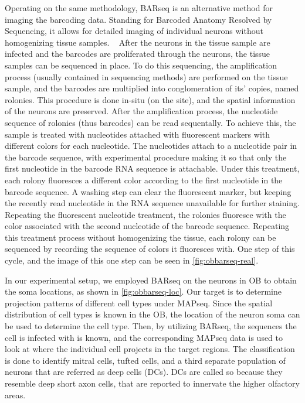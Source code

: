 \documentclass[../dissertation.tex]{subfiles}
\begin{document}
Operating on the same methodology, BARseq is an alternative method for imaging the barcoding data.
Standing for Barcoded Anatomy Resolved by Sequencing, it allows for detailed imaging of individual neurons without homogenizing tissue samples.
~\cite{mapseq060}
After the neurons in the tissue sample are infected and the barcodes are proliferated through the neurons, the tissue samples can be sequenced in place.
To do this sequencing, the amplification process (usually contained in sequencing methods) are performed on the tissue sample, and the barcodes are multiplied into conglomeration of its' copies, named rolonies.
This procedure is done in-situ (on the site), and the spatial information of the neurons are preserved.
After the amplification process, the nucleotide sequence of rolonies (thus barcodes) can be read sequentally.
To achieve this, the sample is treated with nucleotides attached with fluorescent markers with different colors for each nucleotide.
The nucleotides attach to a nucleotide pair in the barcode sequence, with experimental procedure making it so that only the first nucleotide in the barcode RNA sequence is attachable.
Under this treatment, each rolony fluoresces a different color according to the first nucleotide in the barcode sequence.
A washing step can clear the fluorescent marker, but keeping the recently read nucleotide in the RNA sequence unavailable for further staining.
Repeating the fluorescent nucleotide treatment, the rolonies fluoresce with the color associated with the second nucleotide of the barcode sequence.
Repeating this treatment process without homogenizing the tissue, each rolony can be sequenced by recording the sequence of colors it fluoresces with.
One step of this cycle, and the image of this one step can be seen in \cref{fig:obbarseq-real}.

In our experimental setup, we employed BARseq on the neurons in OB to obtain the soma locations, as shown in \cref{fig:obbarseq-loc}.
Our target is to determine projection patterns of different cell types under MAPseq.
Since the spatial distribution of cell types is known in the OB, the location of the neuron soma can be used to determine the cell type.
Then, by utilizing BARseq, the sequences the cell is infected with is known, and the corresponding MAPseq data is used to look at where the individual cell projects in the target regions.
The classification is done to identify mitral cells, tufted cells, and a third separate population of neurons that are referred as deep cells (DCs).
DCs are called so because they resemble deep short axon cells, that are reported to innervate the higher olfactory areas.
~\cite{mapseq078,mapseq079}
\end{document}
